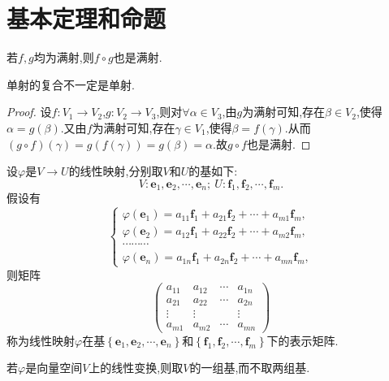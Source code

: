 \documentclass[../../main.tex]{subfiles}
\begin{document}
\section{基本定理和命题}

\begin{proposition}[满射的复合仍是满射]\label{proposition:满射的复合仍是满射}
若\(f,g\)均为满射,则\(f\circ g\)也是满射.
\end{proposition}
\begin{remark}
单射的复合不一定是单射.
\end{remark}
\begin{proof}
设\(f:V_1\rightarrow V_2\),\(g:V_2\rightarrow V_3\),则对\(\forall \alpha \in V_3\),由\(g\)为满射可知,存在\(\beta \in V_2\),使得\(\alpha = g(\beta)\).又由\(f\)为满射可知,存在\(\gamma \in V_1\),使得\(\beta = f(\gamma)\).从而\((g\circ f)(\gamma)=g(f(\gamma)) = g(\beta)=\alpha\).故\(g\circ f\)也是满射.
\end{proof}

\begin{definition}[线性映射的表示矩阵]\label{definition:线性映射的表示矩阵}
设\(\varphi\)是\(V\to U\)的线性映射,分别取\(V\)和\(U\)的基如下:
\[
V:\boldsymbol{e}_1,\boldsymbol{e}_2,\cdots,\boldsymbol{e}_n; \ U:\boldsymbol{f}_1,\boldsymbol{f}_2,\cdots,\boldsymbol{f}_m.
\]
假设有
\[
\begin{cases}
\varphi(\boldsymbol{e}_1)=a_{11}\boldsymbol{f}_1 + a_{21}\boldsymbol{f}_2+\cdots + a_{m1}\boldsymbol{f}_m,\\
\varphi(\boldsymbol{e}_2)=a_{12}\boldsymbol{f}_1 + a_{22}\boldsymbol{f}_2+\cdots + a_{m2}\boldsymbol{f}_m,\\
\cdots\cdots\cdots\\
\varphi(\boldsymbol{e}_n)=a_{1n}\boldsymbol{f}_1 + a_{2n}\boldsymbol{f}_2+\cdots + a_{mn}\boldsymbol{f}_m,
\end{cases}
\]
则矩阵
\[
\begin{pmatrix}
a_{11}&a_{12}&\cdots&a_{1n}\\
a_{21}&a_{22}&\cdots&a_{2n}\\
\vdots&\vdots&&\vdots\\
a_{m1}&a_{m2}&\cdots&a_{mn}
\end{pmatrix}
\]
称为线性映射\(\varphi\)在基$\left\{ \boldsymbol{e}_1,\boldsymbol{e}_2,\cdots ,\boldsymbol{e}_n \right\}$和$\left\{ \boldsymbol{f}_1,\boldsymbol{f}_2,\cdots ,\boldsymbol{f}_m \right\}$下的表示矩阵.
\end{definition}
\begin{remark}
若\(\varphi\)是向量空间\(V\)上的线性变换,则取\(V\)的一组基,而不取两组基.
\end{remark}
\end{document}

